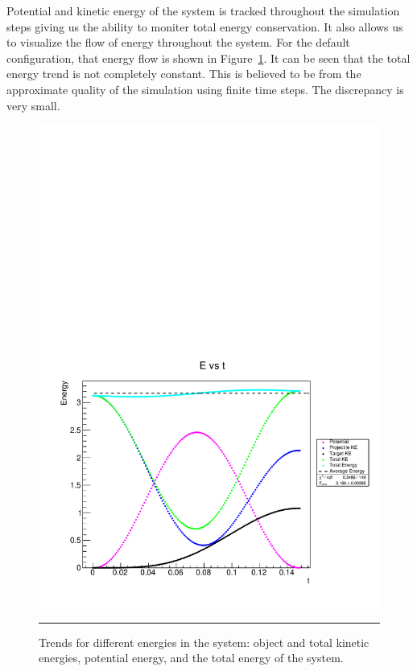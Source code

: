 \documentclass[aps,prl,floatfix,preprint,nofootinbib]{revtex4}
\begin{document}
Potential and kinetic energy of the system is tracked throughout the simulation steps giving us the ability to moniter total energy conservation. It also allows us to visualize the flow of energy throughout the system. For the default configuration, that energy flow is shown in Figure~\ref{fig:energy_default}. It can be seen that the total energy trend is not completely constant. This is believed to be from the approximate quality of the simulation using finite time steps. The discrepancy is very small.
\begin{figure}
  \includegraphics[width=.8\textwidth]{plots/default/E_vs_t.pdf}
                  {\par\nobreak\rule[9pt]{35em}{0.5pt}\vspace{-5mm}}
                  \caption{Trends for different energies in the system: object and total kinetic energies, potential energy, and the total energy of the system.}
                  \label{fig:energy_default}
\end{figure}
\end{document}
